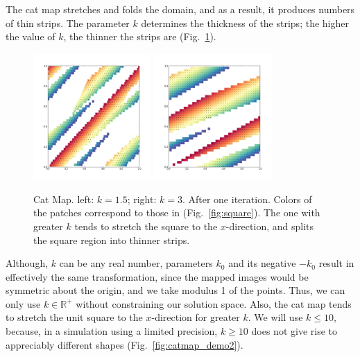 \documentclass[12pt,draft]{reedmcm}
\begin{document}
The cat map stretches and folds the domain, and as a result, it produces numbers of thin strips.
The parameter $k$ determines the thickness of the strips;
the higher the value of $k$, the thinner the strips are (Fig.~\ref{fig:catmap_demo1}).
\begin{figure}[p]
  \centering
  \includegraphics[width=0.4\textwidth]{catmap_1-5}
  \hspace{2cm}
  \includegraphics[width=0.4\textwidth]{catmap_3}
  \caption{Cat Map. left: $k=1.5$; right: $k = 3$. After one iteration. 
    Colors of the patches correspond to those in (Fig.~\ref{fig:square}).
    The one with greater $k$ tends to stretch the square to the $x$-direction, and splits the square region into thinner strips.
  }
  \label{fig:catmap_demo1}
\end{figure}
%
Although, $k$ can be any real number, parameters $k_0$ and its negative $-k_0$ result in effectively the same transformation, since the mapped images would be symmetric about the origin, and we take modulus 1 of the points.
Thus, we can only use $k \in \mathbb{R}^+$ without constraining our solution space.
Also, the cat map tends to stretch the unit square to the $x$-direction for greater $k$.
We will use $k \leq 10$, because, in a simulation using a limited precision, $k\geq 10$ does not give rise to appreciably different shapes (Fig.~\ref{fig:catmap_demo2}).
\end{document}

